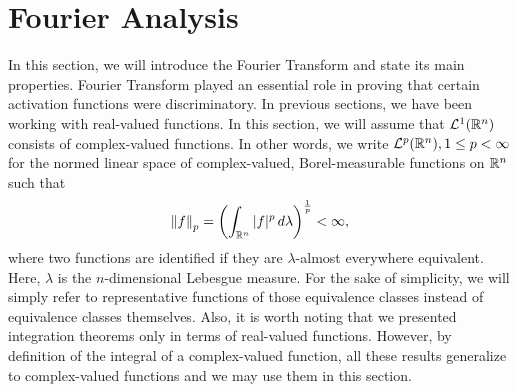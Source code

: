 \section{Fourier Analysis}
\label{section:appendix:fourier}
In this section, we will introduce the Fourier Transform and state its main properties. Fourier Transform played an essential role in proving that certain activation functions were discriminatory. In previous sections, we have been working with real-valued functions. In this section, we will assume that ${\mathcal {L}^1}({\mathbb R}^n)$ consists of complex-valued functions. In other words, we write ${\mathcal {L}^p}({\mathbb R}^n), 1 \leq p < \infty$ for the normed linear space of complex-valued, Borel-measurable functions on ${\mathbb R}^n$ such that
\begin{align*}
    \left\lVert f\right\rVert_p = \left(\int_{{\mathbb R}^n} |f|^p \, d\lambda \right )^{\frac{1}{p}} < \infty,
\end{align*}
where two functions are identified if they are $\lambda$-almost everywhere equivalent. Here, $\lambda$ is the $n$-dimensional Lebesgue measure. For the sake of simplicity, we will simply refer to representative functions of those equivalence classes instead
of equivalence classes themselves. Also, it is worth noting that we presented integration theorems only in terms of real-valued functions. However, by definition of the integral of a complex-valued function, all these results generalize to complex-valued functions and we may use them in this section.





